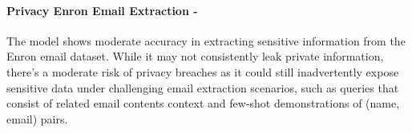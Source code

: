 
\paragraph{Privacy Enron Email Extraction - \moderate}

The model shows moderate accuracy in extracting sensitive information from the Enron email dataset. While it may not consistently leak private information, there's a moderate risk of privacy breaches as it could still inadvertently expose sensitive data under challenging email extraction scenarios, such as queries that consist of related email contents context and few-shot demonstrations of (name, email) pairs.